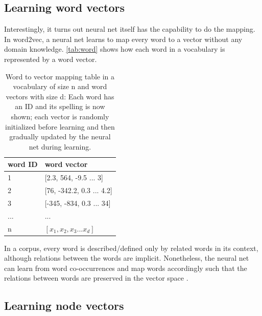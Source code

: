 \documentclass{article}
\begin{document}
\subsection{Learning word vectors}
Interestingly, it turns out neural net itself has the capability to do the 
mapping.
In word2vec, a neural net learns to map every word to a vector without any 
domain knowledge.
\autoref{tab:word} shows how each word in a vocabulary is represented by a word 
vector.
\begin{table}[h]
	\centering
	\begin{tabularx}{0.5\textwidth}{|X|X|} \hline
		word ID & word vector \\ \hline
		1 & [2.3, 564, -9.5 ... 3] \\ \hline
		2 & [76, -342.2, 0.3 ... 4.2] \\ \hline
		3 & [-345, -834, 0.3 ... 34] \\ \hline
		... & ... \\ \hline
		n & $ [x_1, x_2, x_3 ... x_d] $ \\ \hline
	\end{tabularx}
	\caption{Word to vector mapping table in a vocabulary of size n and word 
	vectors with size d: 
	Each word has an ID and its spelling is now shown;
	each vector is randomly initialized before learning and then gradually 
	updated by the neural net during learning.}
	\label{tab:word}
\end{table}
In a corpus, every word is described/defined only by related 
words in its context, although relations between the words are implicit. 
Nonetheless, the neural net can learn from word co-occurrences and map words 
accordingly such that the relations between words are preserved in the vector 
space \cite{mikolov2013distributed}.

\subsection{Learning node vectors}
\end{document}

